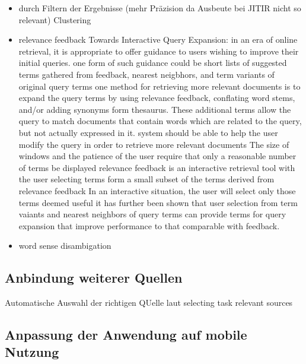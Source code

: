\begin{itemize}
 		\item durch Filtern der Ergebnisse (mehr Präzision da Ausbeute bei JITIR nicht so relevant) Clustering\cite{budzik2000user}
 		\item relevance feedback
 				Towards Interactive Query Expansion:
in an era of online retrieval, it is appropriate to offer guidance to users wishing to improve their initial queries. one form of such guidance could be short lists of suggested terms gathered from feedback, nearest neigbhors, and term variants of original query terms
one method for retrieving more relevant documents is to expand the query terms by using relevance feedback, conflating word stems, and/or adding synonyms form thesaurus. These additional terms allow the query to match documents that contain words which are related to the query, but not actually expressed in it. 
system should be able to help the user modify the query in order to retrieve more relevant documents
The size of windows and the patience of the user require that only a reasonable number of terms be displayed
relevance feedback is an interactive retrieval tool
with the user selecting terms form a small subset of the terms derived from relevance feedback
In an interactive situation, the user will select only those terms deemed useful
it has further been shown that user selection from term vaiants and nearest neighbors of query terms can provide terms for query expansion that improve performance to that comparable with feedback.
	\item word sense disambigation \cite{budzik2000user}
	\end{itemize}
\subsection{Anbindung weiterer Quellen}
	Automatische Auswahl der richtigen QUelle laut selecting task relevant sources
 \subsection{Anpassung der Anwendung auf mobile Nutzung}